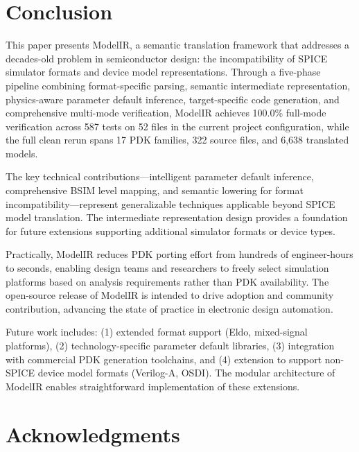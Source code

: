 \documentclass[10pt,twocolumn]{article}
\begin{document}
\section{Conclusion}
\label{sec:conclusion}

This paper presents ModelIR, a semantic translation framework that addresses a decades-old problem in semiconductor design: the incompatibility of SPICE simulator formats and device model representations. Through a five-phase pipeline combining format-specific parsing, semantic intermediate representation, physics-aware parameter default inference, target-specific code generation, and comprehensive multi-mode verification, ModelIR achieves 100.0\% full-mode verification across 587 tests on 52 files in the current project configuration, while the full clean rerun spans 17 PDK families, 322 source files, and 6,638 translated models.

The key technical contributions---intelligent parameter default inference, comprehensive BSIM level mapping, and semantic lowering for format incompatibility---represent generalizable techniques applicable beyond SPICE model translation. The intermediate representation design provides a foundation for future extensions supporting additional simulator formats or device types.

Practically, ModelIR reduces PDK porting effort from hundreds of engineer-hours to seconds, enabling design teams and researchers to freely select simulation platforms based on analysis requirements rather than PDK availability. The open-source release of ModelIR is intended to drive adoption and community contribution, advancing the state of practice in electronic design automation.

Future work includes: (1) extended format support (Eldo, mixed-signal platforms), (2) technology-specific parameter default libraries, (3) integration with commercial PDK generation toolchains, and (4) extension to support non-SPICE device model formats (Verilog-A, OSDI). The modular architecture of ModelIR enables straightforward implementation of these extensions.

\section*{Acknowledgments}
\end{document}
